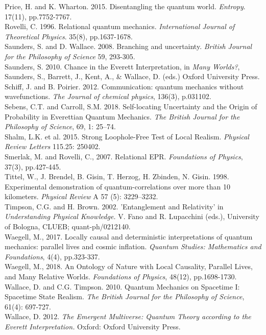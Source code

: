 \documentclass[a4paper]{article}
\begin{document}
Price, H. and K. Wharton. 2015. Disentangling the quantum world. \textit{Entropy}. 17(11), pp.7752-7767.\\

Rovelli, C. 1996. Relational quantum mechanics. \textit{International Journal of Theoretical Physics}. 35(8), pp.1637-1678.\\

Saunders, S. and D. Wallace. 2008. Branching and uncertainty. \textit{British Journal for the
Philosophy of Science} 59, 293-305.\\

Saunders, S. 2010. Chance in the Everett Interpretation, in \textit{Many Worlds?}, Saunders, S., Barrett, J., Kent, A., \& Wallace, D. (eds.) Oxford University Press.\\

Schiff, J. and B. Poirier. 2012. Communication: quantum mechanics without wavefunctions. \textit{The Journal of chemical physics}, 136(3), p.031102.\\

Sebens, C.T. and Carroll, S.M. 2018. Self-locating Uncertainty and the Origin of Probability in Everettian Quantum Mechanics. \textit{The British Journal for the Philosophy of Science}, 69, 1: 25–74.\\

Shalm, L.K. et al. 2015. Strong Loophole-Free Test of Local Realism. \textit{Physical Review Letters} 115.25: 250402.\\

Smerlak, M. and Rovelli, C., 2007. Relational EPR. \textit{Foundations of Physics}, 37(3), pp.427-445.\\

Tittel, W., J. Brendel, B. Gisin, T. Herzog, H. Zbinden, N. Gisin. 1998. Experimental demonstration of quantum-correlations over more than 10 kilometers. \textit{Physical Review} A 57 (5): 3229–3232.\\

Timpson, C.G. and H. Brown. 2002. 
'Entanglement and Relativity' in \textit{Understanding Physical Knowledge.} V. Fano and R. Lupacchini (eds.), University of Bologna, CLUEB; quant-ph/0212140.\\

Waegell, M., 2017. Locally causal and deterministic interpretations of quantum mechanics: parallel lives and cosmic inflation. \textit{Quantum Studies: Mathematics and Foundations}, 4(4), pp.323-337.\\

Waegell, M., 2018. An Ontology of Nature with Local Causality, Parallel Lives, and Many Relative Worlds. \textit{Foundations of Physics}, 48(12), pp.1698-1730.\\

Wallace, D. and C.G. Timpson. 2010. Quantum Mechanics on Spacetime I: Spacetime State Realism. \textit{The British Journal for the Philosophy of Science}, 61(4): 697-727.\\

Wallace, D. 2012. \textit{The Emergent Multiverse: Quantum Theory according to the Everett Interpretation.} Oxford: Oxford University Press.\\
\end{document}
